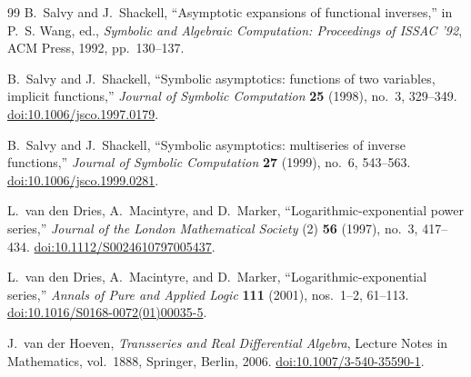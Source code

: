 \documentclass[11pt,oneside,openany]{book}
\begin{document}
\begin{thebibliography}{99}
B.~Salvy and J.~Shackell,
``Asymptotic expansions of functional inverses,''
in P.~S. Wang, ed., \emph{Symbolic and Algebraic Computation:
Proceedings of ISSAC '92}, ACM Press, 1992, pp.~130--137.

B.~Salvy and J.~Shackell,
``Symbolic asymptotics: functions of two variables, implicit functions,''
\emph{Journal of Symbolic Computation} \textbf{25} (1998), no.~3, 329--349.
\href{https://doi.org/10.1006/jsco.1997.0179}{doi:10.1006/jsco.1997.0179}.

B.~Salvy and J.~Shackell,
``Symbolic asymptotics: multiseries of inverse functions,''
\emph{Journal of Symbolic Computation} \textbf{27} (1999), no.~6, 543--563.
\href{https://doi.org/10.1006/jsco.1999.0281}{doi:10.1006/jsco.1999.0281}.

L.~van den Dries, A.~Macintyre, and D.~Marker,
``Logarithmic-exponential power series,''
\emph{Journal of the London Mathematical Society} (2)
\textbf{56} (1997), no.~3, 417--434.
\href{https://doi.org/10.1112/S0024610797005437}{doi:10.1112/S0024610797005437}.

L.~van den Dries, A.~Macintyre, and D.~Marker,
``Logarithmic-exponential series,''
\emph{Annals of Pure and Applied Logic} \textbf{111} (2001), nos.~1--2,
61--113.
\href{https://doi.org/10.1016/S0168-0072(01)00035-5}{doi:10.1016/S0168-0072(01)00035-5}.

J.~van der Hoeven,
\emph{Transseries and Real Differential Algebra},
Lecture Notes in Mathematics, vol.~1888, Springer, Berlin, 2006.
\href{https://doi.org/10.1007/3-540-35590-1}{doi:10.1007/3-540-35590-1}.

\end{thebibliography}
\end{document}
